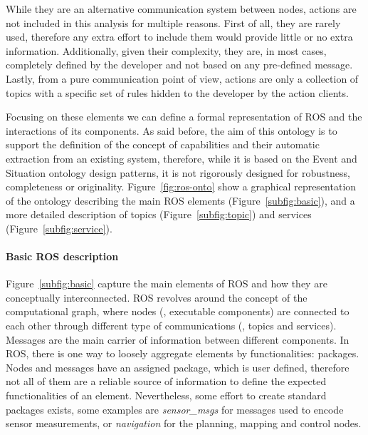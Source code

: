 While they are an alternative communication system between nodes, actions are not included in this analysis for multiple reasons. First of all, they are rarely used, therefore any extra effort to include them would provide little or no extra information. Additionally, given their complexity, they are, in most cases, completely defined by the developer and not based on any pre-defined message. Lastly, from a pure communication point of view, actions are only a collection of topics with a specific set of rules hidden to the developer by the action clients. 

Focusing on these elements we can define a formal representation of ROS and the interactions of its components. As said before, the aim of this ontology is to support the definition of the concept of capabilities and their automatic extraction from an existing system, therefore, while it is based on the Event and Situation ontology design patterns, it is not rigorously designed for robustness, completeness or originality. Figure~\ref{fig:ros-onto} show a graphical representation of the ontology describing the main ROS elements (Figure~\ref{subfig:basic}), and a more detailed description of topics (Figure~\ref{subfig:topic}) and services (Figure~\ref{subfig:service}).

\paragraph{Basic ROS description} Figure~\ref{subfig:basic} capture the main elements of ROS and how they are conceptually interconnected. ROS revolves around the concept of the computational graph, where nodes (\ie, executable components) are connected to each other through different type of communications (\ie, topics and services). Messages are the main carrier of information between different components. In ROS, there is one way to loosely aggregate elements by functionalities: packages. Nodes and messages have an assigned package, which is user defined, therefore not all of them are a reliable source of information to define the expected functionalities of an element. Nevertheless, some effort to create standard packages exists, some examples are \textit{sensor\_msgs} for messages used to encode sensor measurements, or \textit{navigation} for the planning, mapping and control nodes.

